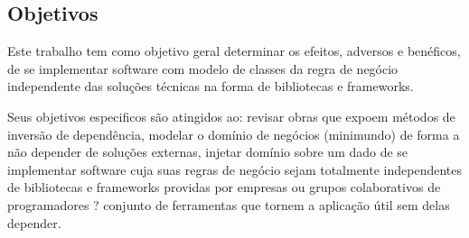 

\subsection{\textbf{Objetivos}}
    \label{sec:objetivos}

    Este trabalho tem como objetivo geral determinar os efeitos, adversos
    e benéficos, de se implementar software com modelo de classes da regra
    de negócio independente das soluções técnicas na forma de bibliotecas e
    frameworks.

    Seus objetivos especificos são atingidos ao: revisar obras que expoem
    métodos de inversão de dependência, modelar o domínio de negócios (minimundo)
    de forma a não depender de soluções externas, injetar domínio sobre um dado
    de se implementar software cuja suas regras de negócio sejam totalmente independentes de bibliotecas e frameworks
    providas por empresas ou grupos colaborativos de programadores ?
    conjunto de ferramentas que tornem a aplicação útil sem delas depender.
